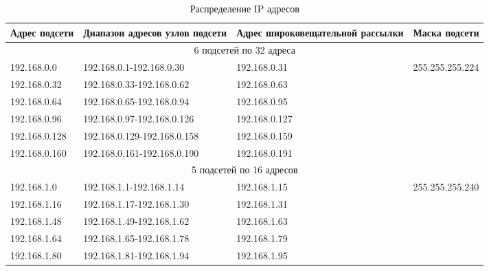 \begin{table}[!htbp]
  \centering
  \begin{tabular}{|l|l|l|l|}
    Адрес подсети & Диапазон адресов узлов подсети & Адрес широковещательной  рассылки & Маска подсети \\ \hline
    \multicolumn{4}{c}{6 подсетей по 32 адреса} \\ \hline
    192.168.0.0 & 192.168.0.1-192.168.0.30 & 192.168.0.31 & \multirow{6}{*}{255.255.255.224} \\ \cline{1-3}
    192.168.0.32 & 192.168.0.33-192.168.0.62 & 192.168.0.63  &  \\ \cline{1-3}
    192.168.0.64 & 192.168.0.65-192.168.0.94 & 192.168.0.95  &  \\ \cline{1-3}
    192.168.0.96 & 192.168.0.97-192.168.0.126 & 192.168.0.127 &  \\ \cline{1-3}
    192.168.0.128 & 192.168.0.129-192.168.0.158 & 192.168.0.159 &  \\ \cline{1-3}
    192.168.0.160 & 192.168.0.161-192.168.0.190 & 192.168.0.191 &  \\ \hline
    \multicolumn{4}{c}{5 подсетей по 16 адресов} \\ \hline
    192.168.1.0 & 192.168.1.1-192.168.1.14 & 192.168.1.15 & \multirow{5}{*}{255.255.255.240} \\ \cline{1-3}
    192.168.1.16 & 192.168.1.17-192.168.1.30 & 192.168.1.31 &  \\ \cline{1-3}
    192.168.1.48 & 192.168.1.49-192.168.1.62 & 192.168.1.63 &  \\ \cline{1-3}
    192.168.1.64 & 192.168.1.65-192.168.1.78 & 192.168.1.79 &  \\ \cline{1-3}
    192.168.1.80 & 192.168.1.81-192.168.1.94 & 192.168.1.95 &  \\ \cline{1-3}
    
  \end{tabular}
  \caption{Распределение IP адресов}
  \label{table:ipfinal}
\end{table}

